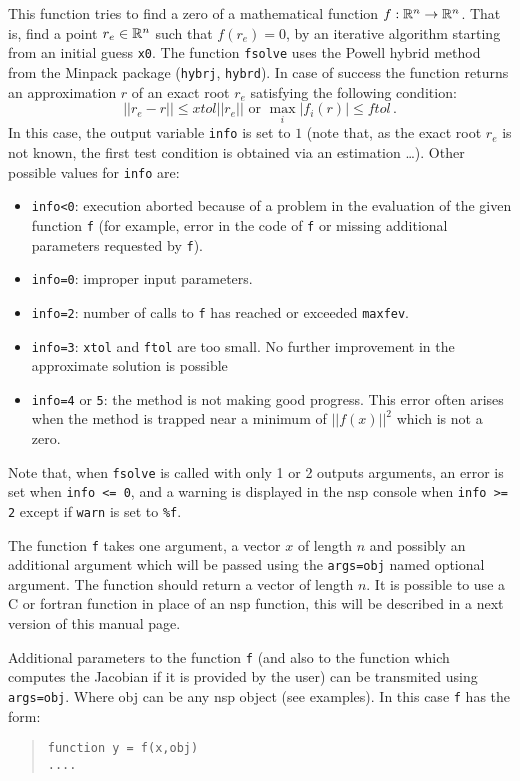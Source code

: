 \begin{mandescription}
This function tries to find a zero of a mathematical function $f: {\mathbb R}^n \rightarrow  {\mathbb R}^n$.
That is, find a point $r_e \in {\mathbb R}^n$ such that $f(r_e)=0$, by an iterative algorithm starting from an initial guess \verb+x0+.
The function \verb+fsolve+ uses the Powell hybrid method from the Minpack package (\verb+hybrj+, \verb+hybrd+). 
In case of success the function returns an approximation $r$ of an exact root $r_e$ satisfying the following condition:  
$$
|| r_e - r || \le xtol || r_e || \mbox{ or } \max_i | f_i(r) | \le ftol\,.
$$
In this case, the output variable \verb+info+ is set to $1$ (note that, as the exact root  $r_e$
is not known, the first test condition is obtained via an estimation \ldots). Other possible values
for \verb+info+ are:
\begin{itemize}
\item \verb+info<0+: execution aborted because of a problem in the evaluation of the given function \verb+f+ 
  (for example, error in the code of \verb+f+ or missing additional parameters requested by \verb+f+).
\item \verb+info=0+: improper input parameters.
\item \verb+info=2+: number of calls to \verb+f+ has reached or exceeded \verb+maxfev+.
\item \verb+info=3+: \verb+xtol+ and \verb+ftol+ are too small. No further improvement in the approximate solution is possible
\item \verb+info=4+ or \verb+5+: the method is not making good progress. This error often arises when the method
  is trapped near a minimum of $||f(x)||^2$ which is not a zero.
\end{itemize}
Note that, when \verb+fsolve+ is called with only 1 or 2 outputs arguments, an error is set 
when \verb+info <= 0+, and a warning is displayed in the nsp console when \verb+info >= 2+ except 
if \verb+warn+ is set to \verb+%f+. 

The function \verb+f+ takes one argument, a vector $x$ of length $n$ and possibly an additional
argument which will be passed using the \verb+args=obj+ named optional argument. The function
should return a vector of length $n$. It is possible to use a C or fortran function in place
of an nsp function, this will be described in a next version of this manual page.

Additional parameters to the function \verb+f+ (and also to the function which computes the Jacobian 
if it is provided by the user) can be transmited using \verb+args=obj+. Where obj can be any nsp 
object (see examples). In this case \verb+f+ has the form:
\begin{quote}
{\tt function y = f(x,obj) \\
      ....}
\end{quote}


\end{mandescription}

